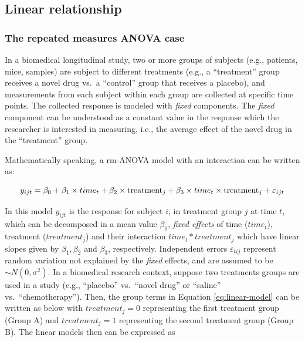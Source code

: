 \documentclass[
]{article}
\begin{document}
\hypertarget{linear-relationship}{%
\subsection{Linear relationship}\label{linear-relationship}}

\hypertarget{the-repeated-measures-anova-case}{%
\subsubsection{The repeated measures ANOVA case}\label{the-repeated-measures-anova-case}}

In a biomedical longitudinal study, two or more groups of subjects (e.g., patients, mice, samples) are subject to different treatments (e.g., a ``treatment'' group receives a novel drug vs.~a ``control'' group that receives a placebo), and measurements from each subject within each group are collected at specific time points. The collected response is modeled with \emph{fixed} components. The \emph{fixed} component can be understood as a constant value in the response which the researcher is interested in measuring, i.e., the average effect of the novel drug in the ``treatment'' group.

Mathematically speaking, a rm-ANOVA model with an interaction can be written as:

\begin{equation}
y_{ijt} = \beta_0+\beta_1 \times time_{t} +\beta_2 \times \textrm{treatment}_{j} +\beta_3 \times time_{t}\times \textrm{treatment}_{j}+\varepsilon_{ijt}\\ 
\label{eq:linear-model}
\end{equation}

In this model \(y_{ijt}\) is the response for subject \(i\), in treatment group \(j\) at time \(t\), which can be decomposed in a mean value \(\beta_0\), \emph{fixed effects} of time (\(time_t\)), treatment (\(treatment_j\)) and their interaction \(time_t*treatment_j\) which have linear slopes given by \(\beta_1, \beta_2\) and \(\beta_3\), respectively. Independent errors \(\varepsilon_{tij}\) represent random variation not explained by the \emph{fixed} effects, and are assumed to be \(\sim N(0,\sigma^2)\).
In a biomedical research context, suppose two treatments groups are used in a study (e.g., ``placebo'' vs.~``novel drug'' or ``saline'' vs.~``chemotherapy''). Then, the group terms in Equation \eqref{eq:linear-model} can be written as below with \(treatment_j=0\) representing the first treatment group (Group A) and \(treatment_j=1\) representing the second treatment group (Group B). The linear models then can be expressed as
\end{document}
